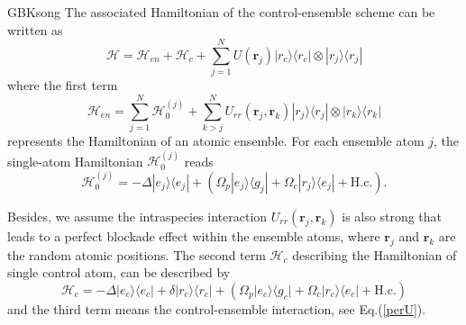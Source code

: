 \documentclass{cpbtex}
\begin{document}
\begin{CJK*}{GBK}{song}
The associated Hamiltonian of the control-ensemble scheme can be written as
\begin{equation}
    \mathcal{H} = \mathcal{H}_{en} + \mathcal{H}_c +  \sum_{j=1}^N U(\bm{r}_j)|r_c\rangle\langle r_c|\otimes|r_j\rangle \langle r_j|
    \label{total}
\end{equation}
where the first term
\begin{equation}
  {\mathcal{H}}_{en}=\sum_{j=1}^{N}\mathcal{H}_0^{(j)}+\sum_{k>j}^NU_{rr}(\bm{r}_j,\bm{r}_k)|r_j\rangle\langle r_j|\otimes|r_k\rangle\langle r_k|
  \label{ensemble}
\end{equation}
represents the Hamiltonian of an atomic ensemble. For each ensemble atom $j$, the single-atom Hamiltonian $\mathcal{H}_0^{(j)}$ reads
\begin{equation}
{\mathcal{H}}_{0}^{(j)}=-\Delta|e_j\rangle\langle e_j|+(\Omega_p|e_j\rangle\langle g_j|+\Omega_c|r_j\rangle\langle e_j|+\text{H.c.}).  
\end{equation}

Besides, we assume the intraspecies interaction $U_{rr}(\bm{r}_j,\bm{r}_k)$
is also strong that leads to a perfect blockade effect within the ensemble atoms, where $\bm{r}_j$ and $\bm{r}_k$ are the random atomic positions. The second term $\mathcal{H}_c$ describing the Hamiltonian of single control atom, can be described by
\begin{equation}
\mathcal{H}_{c}=-\Delta\vert e_c\rangle\langle e_c\vert+\delta\vert r_c\rangle\langle r_c\vert+(\Omega_p\vert e_c\rangle\langle g_c\vert + \Omega_c \vert r_c\rangle\langle e_c\vert +\text{H.c.})
\label{coneq}
\end{equation}
and the third term means the control-ensemble interaction, see Eq.(\ref{perU}).



\end{CJK*}
\end{document}

